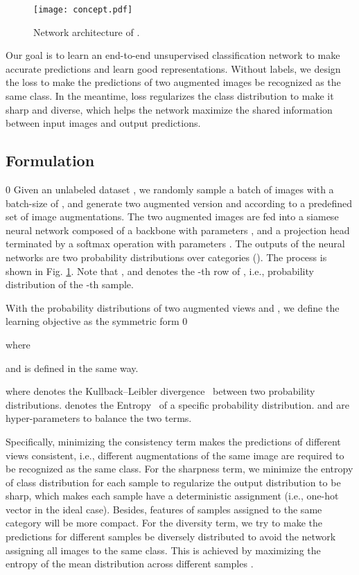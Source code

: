 \documentclass[10pt,twocolumn,letterpaper]{article}
\begin{document}
\begin{figure}
  \begin{center}
  \texttt{[image: concept.pdf]}
  \end{center}
  \vspace{-0.4cm}
  \caption{Network architecture of \ourmethod.}
  \vspace{-0.4cm}
  \label{concept:main}
\end{figure}
Our goal is to learn an end-to-end unsupervised classification network to make accurate predictions and learn good representations. Without labels, we design the \ourmethod loss to make the predictions of two augmented images be recognized as the same class. In the meantime, \ourmethod loss regularizes the class distribution to make it sharp and diverse, which helps the network maximize the shared information between input images and output predictions. 

\subsection{Formulation}
\def\mycmd{0}
\if\mycmd0
Given an unlabeled dataset , we randomly sample a batch of images  with a batch-size of , and generate two augmented version  and  according to a predefined set of image augmentations. The two augmented images are fed into a siamese neural network composed of a backbone  with parameters , and a projection head terminated by a softmax operation  with parameters . The outputs of the neural networks  are two probability distributions over  categories  (). The process is shown in Fig. \ref{concept:main}. 
Note that , and  denotes the -th row of , i.e., probability distribution of the -th sample.

With the probability distributions of two augmented views  and ,
we define the learning objective as the symmetric form 
\def\formu{1}
\if\formu0
    
    where 
    
and  is defined in the same way.
\else
    
\fi
where  denotes the Kullback–Leibler divergence~\cite{kl_information} between two probability distributions.  denotes the Entropy~\cite{entropy} of a specific probability distribution.  and  are hyper-parameters to balance the two terms. 

Specifically, minimizing the consistency term makes the predictions of different views consistent, i.e., different augmentations of the same image are required to be recognized as the same class. For the sharpness term, we minimize the entropy of class distribution for each sample to regularize the output distribution to be sharp, which makes each sample have a deterministic assignment (i.e., one-hot vector in the ideal case). Besides, features of samples assigned to the same category will be more compact. For the diversity term, we try to make the predictions for different samples be diversely distributed to avoid the network assigning all images to the same class. This is achieved by maximizing the entropy of the mean distribution across different samples .
\end{document}
